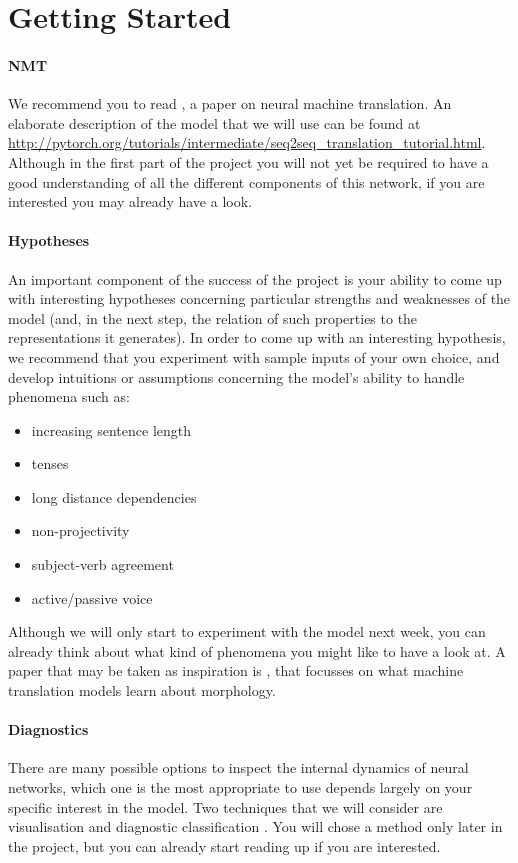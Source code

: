 \documentclass{article}
\begin{document}
\section*{Getting Started}

\paragraph{NMT} We recommend you to read \cite{bahdanau2016neural}, a paper on neural machine translation.
An elaborate description of the model that we will use can be found at \url{http://pytorch.org/tutorials/intermediate/seq2seq_translation_tutorial.html}.
Although in the first part of the project you will not yet be required to have a good understanding of all the different components of this network, if you are interested you may already have a look.

\paragraph{Hypotheses}
An important component of the success of the project is your ability to come up with interesting hypotheses concerning particular strengths and weaknesses of the model (and, in the next step, the relation of such properties to the representations it generates).
In order to come up with an interesting hypothesis, we recommend that you experiment with sample inputs of your own choice, and develop intuitions or assumptions concerning the model’s ability to handle phenomena such as:\begin{itemize}
    \item increasing sentence length
    \item tenses
    \item long distance dependencies
    \item non-projectivity
    \item subject-verb agreement
    \item active/passive voice
\end{itemize}

Although we will only start to experiment with the model next week, you can already think about what kind of phenomena you might like to have a look at.
A paper that may be taken as inspiration is \cite{belinkov2017what},  that focusses on what machine translation models learn about morphology.

\paragraph{Diagnostics} There are many possible options to inspect the internal dynamics of neural networks, which one is the most appropriate to use depends largely on your specific interest in the model.
Two techniques that we will consider are visualisation \cite{karpathy2015visualizing} and diagnostic classification \citep{hupkes2017diagnostic}.
You will chose a method only later in the project, but you can already start reading up if you are interested.


\end{document}
